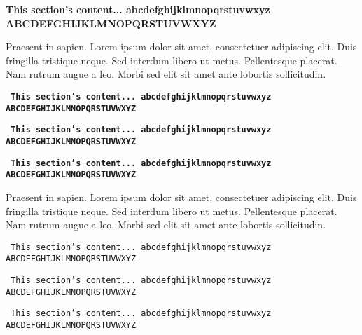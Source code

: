 \textbf{
\normalsize{This section's content... \newline
abcdefghijklmnopqrstuvwxyz \newline
ABCDEFGHIJKLMNOPQRSTUVWXYZ }}

Praesent in sapien. Lorem ipsum dolor sit amet, consectetuer adipiscing elit.
Duis fringilla tristique neque. Sed interdum libero ut metus. Pellentesque placerat.
Nam rutrum augue a leo. Morbi sed elit sit amet ante lobortis sollicitudin.

\clearpage %

\texttt{
\textbf{
\small{This section's content... \newline
abcdefghijklmnopqrstuvwxyz \newline
ABCDEFGHIJKLMNOPQRSTUVWXYZ }}}

\texttt{
\textbf{
\tiny{This section's content... \newline
abcdefghijklmnopqrstuvwxyz \newline
ABCDEFGHIJKLMNOPQRSTUVWXYZ }}}

\texttt{
\textbf{
\normalsize{This section's content... \newline
abcdefghijklmnopqrstuvwxyz \newline
ABCDEFGHIJKLMNOPQRSTUVWXYZ }}}

Praesent in sapien. Lorem ipsum dolor sit amet, consectetuer adipiscing elit.
Duis fringilla tristique neque. Sed interdum libero ut metus. Pellentesque placerat.
Nam rutrum augue a leo. Morbi sed elit sit amet ante lobortis sollicitudin.

\texttt{
\small{This section's content... \newline
abcdefghijklmnopqrstuvwxyz \newline
ABCDEFGHIJKLMNOPQRSTUVWXYZ }}

\texttt{
\tiny{This section's content... \newline
abcdefghijklmnopqrstuvwxyz \newline
ABCDEFGHIJKLMNOPQRSTUVWXYZ }}

\texttt{
\normalsize{This section's content... \newline
abcdefghijklmnopqrstuvwxyz \newline
ABCDEFGHIJKLMNOPQRSTUVWXYZ }}

